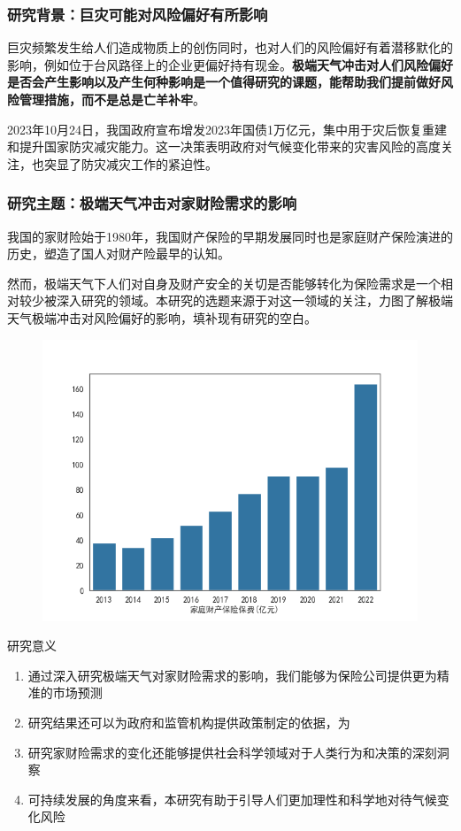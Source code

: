 \documentclass[a4paper,12pt]{ctexbeamer}
\begin{document}
\begin{frame}
    \frametitle{研究背景：巨灾可能对风险偏好有所影响}
    巨灾频繁发生给人们造成物质上的创伤同时，也对人们的风险偏好有着潜移默化的影响，例如位于台风路径上的企业更偏好持有现金\citep{杨娜娜2019自然灾害与企业现金持有}。\textbf{极端天气冲击对人们风险偏好是否会产生影响以及产生何种影响是一个值得研究的课题，能帮助我们提前做好风险管理措施，而不是总是亡羊补牢}。

    2023年10月24日，我国政府宣布增发2023年国债1万亿元，集中用于灾后恢复重建和提升国家防灾减灾能力。这一决策表明政府对气候变化带来的灾害风险的高度关注，也突显了防灾减灾工作的紧迫性。
\end{frame}

\begin{frame}
    \frametitle{研究主题：极端天气冲击对家财险需求的影响}
    我国的家财险始于1980年，我国财产保险的早期发展同时也是家庭财产保险演进的历史\citep{黄英君2008论我国产险公司分散性业务营销模式的创新}，塑造了国人对财产险最早的认知。

    然而，极端天气下人们对自身及财产安全的关切是否能够转化为保险需求是一个相对较少被深入研究的领域。本研究的选题来源于对这一领域的关注，力图了解极端天气极端冲击对风险偏好的影响，填补现有研究的空白。
    \begin{figure}[H]
        \centering
        \includegraphics[width=0.6\linewidth,trim=0 0 0 40]{img/家庭财产保险保费.png}
    \end{figure}
\end{frame}

\begin{frame}{研究意义}
    \begin{enumerate}
        \item 通过深入研究极端天气对家财险需求的影响，我们能够为保险公司提供更为精准的市场预测
        \item 研究结果还可以为政府和监管机构提供政策制定的依据，为
        \item 研究家财险需求的变化还能够提供社会科学领域对于人类行为和决策的深刻洞察
        \item 可持续发展的角度来看，本研究有助于引导人们更加理性和科学地对待气候变化风险
    \end{enumerate}
\end{frame}
\end{document}
